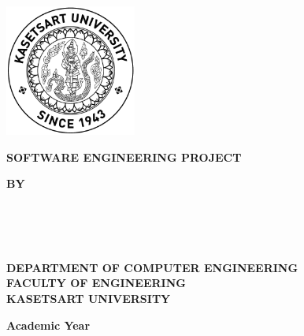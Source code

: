 \thispagestyle{empty}
\begin{center}

    \includegraphics[width=1.7in]{assets/ku/symbol.png}\vspace{.7in}

    {\huge\textbf{SOFTWARE ENGINEERING PROJECT}}\vspace{1in}

    {\huge\textbf{\usevar{\srsTitle}}}\vspace{1in}

    {\huge\textbf{BY}}\vspace{.5in}

    {\huge\textbf{%
        \usevar{\srsAuthorOne} \\
        \usevar{\srsAuthorTwo} \\
        \usevar{\srsAuthorThree} \\
    }}\vfill

    {\Large\textbf{%
        DEPARTMENT OF COMPUTER ENGINEERING\\
        FACULTY OF ENGINEERING\\
        KASETSART UNIVERSITY\\
    }}\vspace{.5in}

    {\LARGE\textbf{Academic Year \usevar{\srsAcademicYear}}}

\end{center}
\restoregeometry